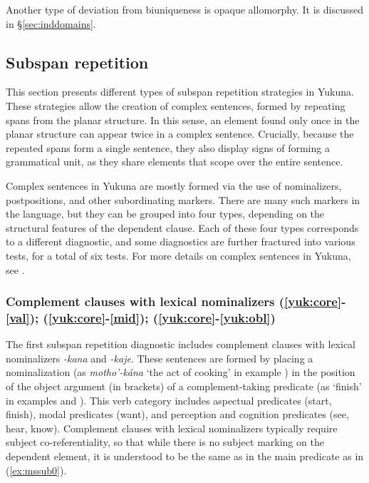 \documentclass[output=paper]{langscibook}
\begin{document}
Another type of deviation from biuniqueness is opaque allomorphy. It is discussed in §\ref{sec:inddomains}.

\subsection{Subspan repetition}

This section presents different types of subspan repetition strategies in Yukuna. These strategies allow the creation of complex sentences, formed by repeating spans from the planar structure. In this sense, an element found only once in the planar structure can appear twice in a complex sentence. Crucially, because the repeated spans form a single sentence, they also display signs of forming a grammatical unit, as they share elements that scope over the entire sentence.

Complex sentences in Yukuna are mostly formed via the use of nominalizers, postpositions, and other subordinating markers. There are many such markers in the language, but they can be grouped into four types, depending on the structural features of the dependent clause. Each of these four types corresponds to a different diagnostic, and some diagnostics are further fractured into various tests, for a total of six tests. For more details on complex sentences in Yukuna, see \citet{lemus2020}.

\subsubsection{Complement clauses with lexical nominalizers (\ref{yuk:core}-\ref{val}); (\ref{yuk:core}-\ref{mid}); (\ref{yuk:core}-\ref{yuk:obl})}

The first subspan repetition diagnostic includes complement clauses with lexical nominalizers \textit{-kana} and \textit{-kaje}. These sentences are formed by placing a nominalization (as \textit{motho'-kána} `the act of cooking' in example ) in the position of the object argument (in brackets) of a complement-taking predicate (as `finish' in examples  and ). This verb category includes aspectual predicates (start, finish), modal predicates (want), and perception and cognition predicates (see, hear, know). Complement clauses with lexical nominalizers typically require subject co-referentiality, so that while there is no subject marking on the dependent element, it is understood to be the same as in the main predicate as in (\ref{ex:mssub0}).
\end{document}
